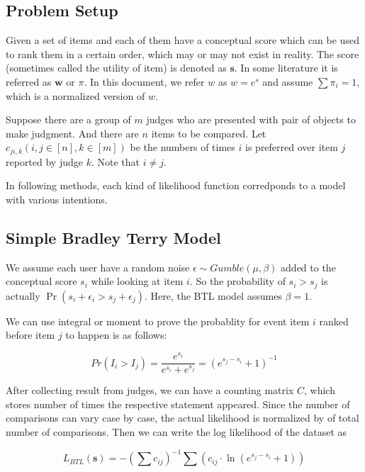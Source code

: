 \documentclass[]{article}
\begin{document}
\hypertarget{problem-setup}{%
\subsection{Problem Setup}\label{problem-setup}}

Given a set of items and each of them have a conceptual score which can
be used to rank them in a certain order, which may or may not exist in
reality. The score (sometimes called the utility of item) is denoted as
\(\mathbf{s}\). In some literature it is referred as \(\mathbf{w}\) or
\(\pi\). In this document, we refer \(w\) as \(w=e^s\) and assume
\(\sum{\pi_i} = 1\), which is a normalized version of \(w\).

Suppose there are a group of \(m\) judges who are presented with pair of
objects to make judgment. And there are \(n\) items to be compared. Let
\(c_{ji,k} (i, j \in [n], k \in[m])\) be the numbers of times \(i\) is
preferred over item \(j\) reported by judge \(k\). Note that
\(i \neq j\).

In following methods, each kind of likelihood function corredponds to a
model with various intentions.

\hypertarget{simple-bradley-terry-model}{%
\subsection{Simple Bradley Terry
Model}\label{simple-bradley-terry-model}}

We assume each user have a random noise
\(\epsilon \sim Gumble(\mu, \beta)\) added to the conceptual score
\(s_i\) while looking at item \(i\). So the probability of \(s_i > s_j\)
is actually \(\Pr(s_i + \epsilon_i > s_j + \epsilon_j)\). Here, the BTL
model assumes \(\beta = 1\).

We can use integral or moment to prove the probablity for event item
\(i\) ranked before item \(j\) to happen is as follows:

\[Pr(I_i > I_j) = \frac{e^{s_i}}{e^{s_i} + e^{s_j}} = \left( {e^{s_j - s_i} + 1} \right)^{-1} \]

After collecting result from judges, we can have a counting matrix
\(C\), which stores number of times the respective statement appeared.
Since the number of comparisons can vary case by case, the actual
likelihood is normalized by of total number of comparisons. Then we can
write the log likelihood of the dataset as

\[L_{BTL}(\mathbf{s}) = -(\sum{c_{ij}})^{-1} \sum{\left( c_{ij} \cdot \ln \left( {e^{s_j - s_i} + 1} \right) \right) }  \]
\end{document}

